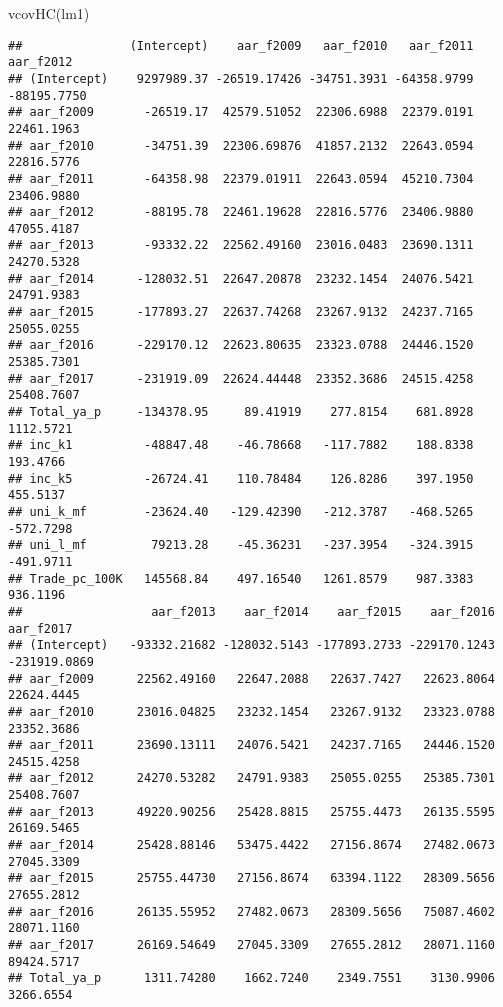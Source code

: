 \documentclass[
]{article}
\newenvironment{Shaded}{\begin{snugshade}}{\end{snugshade}}
\newcommand{\FunctionTok}[1]{\textcolor[rgb]{0.00,0.00,0.00}{#1}}
\newcommand{\NormalTok}[1]{#1}
\begin{document}
\begin{Shaded}
\begin{Highlighting}[]
\FunctionTok{vcovHC}\NormalTok{(lm1)}
\end{Highlighting}
\end{Shaded}

\begin{verbatim}
##               (Intercept)    aar_f2009   aar_f2010   aar_f2011   aar_f2012
## (Intercept)    9297989.37 -26519.17426 -34751.3931 -64358.9799 -88195.7750
## aar_f2009       -26519.17  42579.51052  22306.6988  22379.0191  22461.1963
## aar_f2010       -34751.39  22306.69876  41857.2132  22643.0594  22816.5776
## aar_f2011       -64358.98  22379.01911  22643.0594  45210.7304  23406.9880
## aar_f2012       -88195.78  22461.19628  22816.5776  23406.9880  47055.4187
## aar_f2013       -93332.22  22562.49160  23016.0483  23690.1311  24270.5328
## aar_f2014      -128032.51  22647.20878  23232.1454  24076.5421  24791.9383
## aar_f2015      -177893.27  22637.74268  23267.9132  24237.7165  25055.0255
## aar_f2016      -229170.12  22623.80635  23323.0788  24446.1520  25385.7301
## aar_f2017      -231919.09  22624.44448  23352.3686  24515.4258  25408.7607
## Total_ya_p     -134378.95     89.41919    277.8154    681.8928   1112.5721
## inc_k1          -48847.48    -46.78668   -117.7882    188.8338    193.4766
## inc_k5          -26724.41    110.78484    126.8286    397.1950    455.5137
## uni_k_mf        -23624.40   -129.42390   -212.3787   -468.5265   -572.7298
## uni_l_mf         79213.28    -45.36231   -237.3954   -324.3915   -491.9711
## Trade_pc_100K   145568.84    497.16540   1261.8579    987.3383    936.1196
##                  aar_f2013    aar_f2014    aar_f2015    aar_f2016    aar_f2017
## (Intercept)   -93332.21682 -128032.5143 -177893.2733 -229170.1243 -231919.0869
## aar_f2009      22562.49160   22647.2088   22637.7427   22623.8064   22624.4445
## aar_f2010      23016.04825   23232.1454   23267.9132   23323.0788   23352.3686
## aar_f2011      23690.13111   24076.5421   24237.7165   24446.1520   24515.4258
## aar_f2012      24270.53282   24791.9383   25055.0255   25385.7301   25408.7607
## aar_f2013      49220.90256   25428.8815   25755.4473   26135.5595   26169.5465
## aar_f2014      25428.88146   53475.4422   27156.8674   27482.0673   27045.3309
## aar_f2015      25755.44730   27156.8674   63394.1122   28309.5656   27655.2812
## aar_f2016      26135.55952   27482.0673   28309.5656   75087.4602   28071.1160
## aar_f2017      26169.54649   27045.3309   27655.2812   28071.1160   89424.5717
## Total_ya_p      1311.74280    1662.7240    2349.7551    3130.9906    3266.6554

\end{verbatim}
\end{document}
